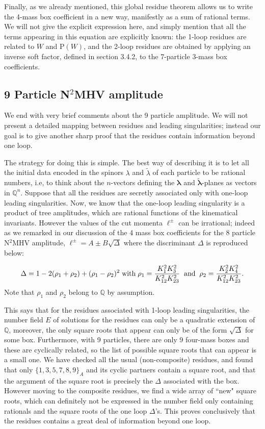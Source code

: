 \documentclass[12pt]{article}
\newcommand{\be}{\begin{eqnarray}}
\newcommand{\ee}{\end{eqnarray}}
\begin{document}
Finally, as we already mentioned, this global residue theorem allows
us to write the 4-mass box coefficient in a new way, manifestly
as a sum of rational terms. We will not give the explicit expression
here, and simply mention that all the terms appearing in this
equation are explicitly known: the 1-loop residues are related to
$W$ and P$(W)$, and the 2-loop residues are obtained by applying an
inverse soft factor, defined in section 3.4.2, to the 7-particle 3-mass box coefficients.


\subsection{9 Particle N$^2$MHV amplitude}
We end with very brief comments about the 9 particle amplitude. We
will not present a detailed mapping between residues and leading
singularities; instead our goal is to give another sharp proof that
the residues contain information beyond one loop.

The strategy for doing this is simple. The best way of describing it
is to let all the initial data encoded in the spinors $\lambda$ and
$\tilde\lambda$ of each particle to be rational numbers, i.e, to
think about the $n$-vectors defining the $\boldsymbol{\lambda}$ and
$\boldsymbol{\tilde\lambda}$-planes as vectors in $\mathbb{Q}^n$.
Suppose that all the residues are secretly associated only with
one-loop leading singularities. Now, we know that the one-loop
leading singularity is a product of tree amplitudes, which are
rational functions of the kinematical invariants. However the values
of the cut momenta $\ell^{\pm}$ can be irrational; indeed as we
remarked in our discussion of the 4 mass box coefficients for the 8
particle N$^2$MHV amplitude, $\ell^{\pm} = A \pm B \sqrt{\Delta}$
where the discriminant $\Delta$ is reproduced below:

\be \label{asum} \Delta = 1-2(\rho_1+\rho_2)+(\rho_1-\rho_2)^2\;
{\rm with}\; \rho_1 = \frac{K_1^2K_3^2}{K_{12}^2K_{23}^2}\;\; {\rm
and} \;\; \rho_2 = \frac{K_2^2K_4^2}{K_{12}^2K_{23}^2}. \ee
%
Note that $\rho_1$ and $\rho_2$ belong to $\mathbb{Q}$ by
assumption.

This says that for the residues associated with 1-loop leading
singularities, the number field $E$ of solutions for the residues
can only be a quadratic extension of $\mathbb{Q}$, moreover, the
only square roots that appear can only be of the form
$\sqrt{\Delta}$ for some box. Furthermore, with 9 particles, there
are only 9 four-mass boxes and these are cyclically related, so the
list of possible square roots that can appear is a small one. We
have checked all the usual (non-composite) residues, and found that
only $\{1,3,5,7,8,9\}_A$ and its cyclic partners contain a square
root, and that the argument of the square root is precisely the
$\Delta$ associated with the box. However moving to the composite
residues, we find a wide array of ``new" square roots, which can
definitely not be expressed in the number field only containing
rationals and the square roots of the one loop $\Delta$'s. This
proves conclusively that the residues contains a great deal of
information beyond one loop.
\end{document}
